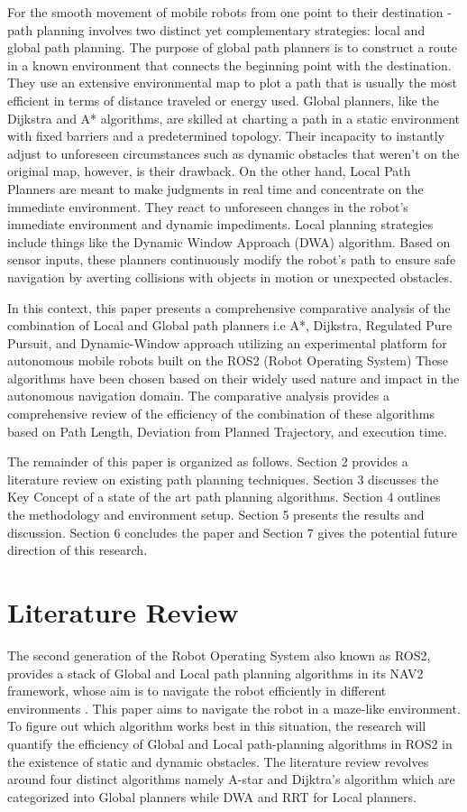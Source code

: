 \documentclass[sigconf]{acmart}
\begin{document}
For the smooth movement of mobile robots from one point to their destination - path planning involves two distinct yet complementary strategies: local and global path planning.
The purpose of global path planners is to construct a route in a known environment that connects the beginning point with the destination. They use an extensive environmental map to plot a path that is usually the most efficient in terms of distance traveled or energy used. Global planners, like the Dijkstra and A* algorithms, are skilled at charting a path in a static environment with fixed barriers and a predetermined topology. Their incapacity to instantly adjust to unforeseen circumstances such as dynamic obstacles that weren't on the original map, however, is their drawback.
On the other hand, Local Path Planners are meant to make judgments in real time and concentrate on the immediate environment. They react to unforeseen changes in the robot's immediate environment and dynamic impediments. Local planning strategies include things like the Dynamic Window Approach (DWA) algorithm. Based on sensor inputs, these planners continuously modify the robot's path to ensure safe navigation by averting collisions with objects in motion or unexpected obstacles.

In this context, this paper presents a comprehensive comparative analysis of the combination of Local and Global path planners i.e A*, Dijkstra, Regulated Pure Pursuit, and Dynamic-Window approach utilizing an experimental platform for autonomous mobile robots built on the ROS2 (Robot Operating System) These algorithms have been chosen based on their widely used nature and impact in the autonomous navigation domain. The comparative analysis provides a comprehensive review of the efficiency of the combination of these algorithms based on Path Length, Deviation from Planned Trajectory, and execution time.

The remainder of this paper is organized as follows. Section 2 provides a literature review on existing path planning techniques. Section 3 discusses the Key Concept of a state of the art path planning algorithms. Section 4 outlines the methodology and environment setup. Section 5 presents the results and discussion. Section 6 concludes the paper and Section 7 gives the potential future direction of this research.
\section{Literature Review}

The second generation of the Robot Operating System also known as ROS2, provides a stack of Global and Local path planning algorithms in its NAV2 framework, whose aim is to navigate the robot efficiently in different environments \cite{b14}. This paper aims to navigate the robot in a maze-like environment. To figure out which algorithm works best in this situation, the research will quantify the efficiency of Global and Local path-planning algorithms in ROS2 in the existence of static and dynamic obstacles. The literature review revolves around four distinct algorithms namely A-star and Dijktra's algorithm which are categorized into Global planners while DWA and RRT for Local planners.  
\end{document}
